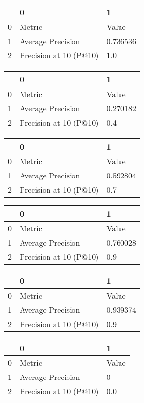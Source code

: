 \begin{tabular}{lll}
\toprule
{} &                       0 &         1 \\
\midrule
0 &                  Metric &     Value \\
1 &       Average Precision &  0.736536 \\
2 &  Precision at 10 (P@10) &       1.0 \\
\bottomrule
\end{tabular}

\begin{tabular}{lll}
\toprule
{} &                       0 &         1 \\
\midrule
0 &                  Metric &     Value \\
1 &       Average Precision &  0.270182 \\
2 &  Precision at 10 (P@10) &       0.4 \\
\bottomrule
\end{tabular}


\begin{tabular}{lll}
\toprule
{} &                       0 &         1 \\
\midrule
0 &                  Metric &     Value \\
1 &       Average Precision &  0.592804 \\
2 &  Precision at 10 (P@10) &       0.7 \\
\bottomrule
\end{tabular}

\begin{tabular}{lll}
\toprule
{} &                       0 &         1 \\
\midrule
0 &                  Metric &     Value \\
1 &       Average Precision &  0.760028 \\
2 &  Precision at 10 (P@10) &       0.9 \\
\bottomrule
\end{tabular}

\begin{tabular}{lll}
\toprule
{} &                       0 &         1 \\
\midrule
0 &                  Metric &     Value \\
1 &       Average Precision &  0.939374 \\
2 &  Precision at 10 (P@10) &       0.9 \\
\bottomrule
\end{tabular}

\begin{tabular}{lll}
\toprule
{} &                       0 &      1 \\
\midrule
0 &                  Metric &  Value \\
1 &       Average Precision &      0 \\
2 &  Precision at 10 (P@10) &    0.0 \\
\bottomrule
\end{tabular}

